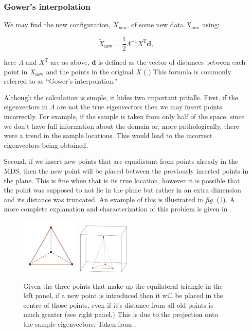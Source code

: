 \documentclass[a4paper,10pt]{amsart}
\newcommand{\fig}[1]{\emph{fig.} (\ref{#1})}
\newcommand{\tr}[1]{#1^{\text{T}}}
\begin{document}
\subsubsection{Gower's interpolation} 

We may find the new configuration, $\tilde{X}_{\text{new}}$, of some new data $X_{\text{new}}$ using:

\begin{equation}
\tilde{X}_{\text{new}} = \frac{1}{2} \Lambda^{-1} \tr{X} \mathbf{d},
\end{equation}

here $\Lambda$ and $\tr{X}$ are as above, $\mathbf{d}$ is defined as the vector of distances between each point in $X_{\text{new}}$ and the points in the original $X$ (\cite{gower1968}.) This formula is commonly referred to as ``Gower's interpolation.''

Although the calculation is simple, it hides two important pitfalls. First, if the eigenvectors in $\Lambda$ are not the true eigenvectors then we may insert points incorrectly. For example, if the sample is taken from only half of the space, since we don't have full information about the domain or, more pathologically, there were a trend in the sample locations. This would lead to the incorrect eigenvectors being obtained.

Second, if we insert new points that are equidistant from points already in the MDS, then the new point will be placed between the previously inserted points in the plane. This is fine when that is its true location, however it is possible that the point was supposed to not lie in the plane but rather in an extra dimension and its distance was truncated. An example of this is illustrated in \fig{bojinsert}. A more complete explanation and characterization of this problem is given in \cite{Boj2009}.

\begin{figure}
\centering
\includegraphics{figs/boj0.jpg} \includegraphics[width=1in]{figs/boj1.jpg} \\
\caption{Given the three points that make up the equilateral triangle in the left panel, if a new point is introduced then it will be placed in the centre of those points, even if it's distance from all old points is much greater (see right panel.) This is due to the projection onto the sample eigenvectors. Taken from \cite{Boj2009}.}
\label{bojinsert}
\end{figure}
\end{document}
